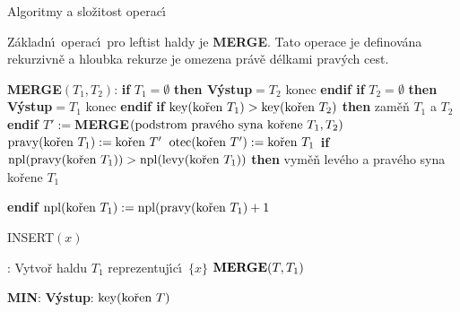 \head
Algoritmy a slo\v zitost operac\'\i
\endhead

\flushpar Z\'akladn\'\i\ operac\'\i\ pro leftist haldy je {\bf MERGE}. Tato 
operace je definov\'ana rekurzivn\v e a hloubka rekurze je omezena 
pr\'av\v e d\'elkami prav\'ych cest.
\bigskip

{\bf MERGE$(T_1,T_2)$}:\newline 
{\bf if} $T_1=\emptyset$ {\bf then V\'ystup$=T_2$} konec {\bf endif\newline 
if} $T_2=\emptyset$ {\bf then V\'ystup$=T_1$} konec {\bf endif\newline 
if} $\key(\text{\rm ko\v ren }T_1)>\key(\text{\rm ko\v ren }T_2)$ {\bf then\newline 
\phantom{{\rm ---}}}zam\v e\v n $T_1$ a $T_2$\newline 
{\bf endif\newline 
$T':=$MERGE$(\text{{{\rm podstrom prav\'eho syna ko\v rene }}}T_1
,T_2)$\newline 
$\pravy(\text{\rm{{\rm ko\v ren }}}T_1):=\text{\rm{{\rm ko\v ren }}}
T'$\newline 
$\otec(\text{\rm {\rm ko\v ren }}T'):=\text{\rm {\rm ko\v ren }}T_
1$\newline 
if} $\npl(\pravy(\text{\rm ko\v ren }T_1))>\npl(\levy(\text{\rm ko\v ren }
T_1))$ {\bf then\newline 
\phantom{{\rm ---}}}vym\v e\v n lev\'eho a prav\'eho syna ko\v rene $
T_1$\newline 
{\bf endif\newline 
$\npl(\text{{\rm {\rm ko\v ren }}}T_1):=\npl(\pravy(\text{{\rm {\rm ko\v ren }}}
T_1)+1$
\bigskip

INSERT$(x)$}:\newline 
Vytvo\v r haldu $T_1$ reprezentuj\'\i c\'\i\ $\{x\}$\newline 
$\bold M\bold E\bold R\bold G\bold E(T,T_1)$
\bigskip

{\bf MIN}:\newline 
{\bf V\'ystup}: $\key(\text{\rm ko\v ren }T)$
\bigskip

